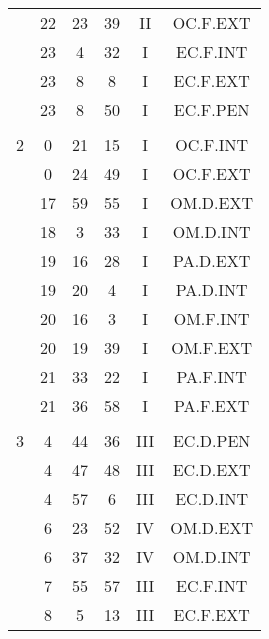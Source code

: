 \documentclass[12pt, a4paper]{article}
\begin{document}
\begin{multicols}{3}
{\begin{tabular}{c c c c c c}
	 	 	 	 & 22 & 23 & 39 & II & OC.F.EXT\\%
	 	 	 	 & 23 & 4 & 32 & I & EC.F.INT\\%
	 	 	 	 & 23 & 8 & 8 & I & EC.F.EXT\\%
	 	 	 	 & 23 & 8 & 50 & I & EC.F.PEN\\%
	 	 	 	 & & & & & \\%
	 	 	 	2 & 0 & 21 & 15 & I & OC.F.INT\\%
	 	 	 	 & 0 & 24 & 49 & I & OC.F.EXT\\%
	 	 	 	 & 17 & 59 & 55 & I & OM.D.EXT\\%
	 	 	 	 & 18 & 3 & 33 & I & OM.D.INT\\%
	 	 	 	 & 19 & 16 & 28 & I & PA.D.EXT\\%
	 	 	 	 & 19 & 20 & 4 & I & PA.D.INT\\%
	 	 	 	 & 20 & 16 & 3 & I & OM.F.INT\\%
	 	 	 	 & 20 & 19 & 39 & I & OM.F.EXT\\%
	 	 	 	 & 21 & 33 & 22 & I & PA.F.INT\\%
	 	 	 	 & 21 & 36 & 58 & I & PA.F.EXT\\%
	 	 	 	 & & & & & \\%
	 	 	 	3 & 4 & 44 & 36 & III & EC.D.PEN\\%
	 	 	 	 & 4 & 47 & 48 & III & EC.D.EXT\\%
	 	 	 	 & 4 & 57 & 6 & III & EC.D.INT\\%
	 	 	 	 & 6 & 23 & 52 & IV & OM.D.EXT\\%
	 	 	 	 & 6 & 37 & 32 & IV & OM.D.INT\\%
	 	 	 	 & 7 & 55 & 57 & III & EC.F.INT\\%
	 	 	 	 & 8 & 5 & 13 & III & EC.F.EXT\\%

\end{tabular}}
\end{multicols}
\end{document}
